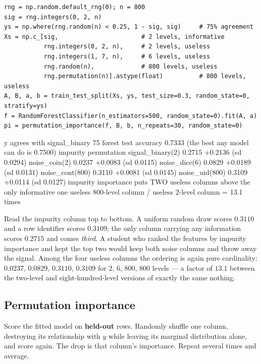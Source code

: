 \documentclass[11pt]{article}
\begin{document}
\begin{lstlisting}
rng = np.random.default_rng(0); n = 800
sig = rng.integers(0, 2, n)
ys = np.where(rng.random(n) < 0.25, 1 - sig, sig)     # 75% agreement
Xs = np.c_[sig,                       # 2 levels, informative
           rng.integers(0, 2, n),     # 2 levels, useless
           rng.integers(1, 7, n),     # 6 levels, useless
           rng.random(n),             # 800 levels, useless
           rng.permutation(n)].astype(float)          # 800 levels, useless
A, B, a, b = train_test_split(Xs, ys, test_size=0.3, random_state=0, stratify=ys)
f = RandomForestClassifier(n_estimators=500, random_state=0).fit(A, a)
pi = permutation_importance(f, B, b, n_repeats=30, random_state=0)
\end{lstlisting}
\begin{codeout}
y agrees with signal_binary 75%
forest test accuracy 0.7333  (the best any model can do is 0.7500)
                     impurity   permutation
signal_binary(2)       0.2715     +0.2136  (sd 0.0294)
noise_coin(2)          0.0237     +0.0083  (sd 0.0115)
noise_dice(6)          0.0829     +0.0189  (sd 0.0131)
noise_cont(800)        0.3110     +0.0081  (sd 0.0145)
noise_uid(800)         0.3109     +0.0114  (sd 0.0127)
impurity importance puts TWO useless columns above the only informative one
useless 800-level column / useless 2-level column = 13.1 times
\end{codeout}

Read the impurity column top to bottom. A uniform random draw scores $0.3110$
and a row identifier scores $0.3109$; the only column carrying any information
scores $0.2715$ and comes \emph{third}. A student who ranked the features by
impurity importance and kept the top two would keep both noise columns and
throw away the signal. Among the four useless columns the ordering is again
pure cardinality: $0.0237$, $0.0829$, $0.3110$, $0.3109$ for $2$, $6$, $800$,
$800$ levels --- a factor of $13.1$ between the two-level and eight-hundred-level
versions of exactly the same nothing.

\subsection{Permutation importance}

\begin{keyidea}
Score the fitted model on \textbf{held-out} rows. Randomly shuffle one column,
destroying its relationship with $y$ while leaving its marginal distribution
alone, and score again. The drop is that column's importance. Repeat several
times and average.
\end{keyidea}
\end{document}
